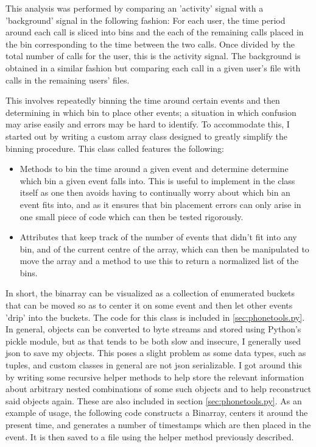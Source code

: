 This analysis was performed by comparing an 'activity' signal with a 'background' signal in the following fashion: For each user, the time period around each call is sliced into bins and the each of the remaining calls placed in the bin corresponding to the time between the two calls. Once divided by the total number of calls for the user, this is the activity signal. The background is obtained in a similar fashion but comparing each call in a given user's file with calls in the remaining users' files.

This involves repeatedly binning the time around certain events and then determining in which bin to place other events; a situation in which confusion may arise easily and errors may be hard to identify. To accommodate this, I started out by writing a custom array class designed to greatly simplify the binning procedure. This class called features the following:
\begin{itemize}
	\item Methods to bin the time around a given event and determine determine which bin a given event falls into. This is useful to implement in the class itself as one then avoids having to continually worry about which bin an event fits into, and as it ensures that bin placement errors can only arise in one small piece of code which can then be tested rigorously.
	\item Attributes that keep track of the number of events that didn't fit into any bin, and of the current centre of the array, which can then be manipulated to move the array and a method to use this to return a normalized list of the bins.
\end{itemize}
In short, the binarray can be visualized as a collection of enumerated buckets that can be moved so as to center it on some event and then let other events 'drip' into the buckets. The code for this class is included in \ref{sec:phonetools.py}. In general, objects can be converted to byte streams and stored using Python's pickle module, but as that tends to be both slow and insecure, I generally used json to save my objects. This poses a slight problem as some data types, such as tuples, and custom classes in general are not json serializable. I got around this by writing some recursive helper methods to help store the relevant information about arbitrary nested combinations of some such objects and to help reconstruct said objects again. These are also included in section \ref{sec:phonetools.py}. As an example of usage, the following code constructs a Binarray, centers it around the present time, and generates a number of timestamps which are then placed in the event. It is then saved to a file using the helper method previously described.
